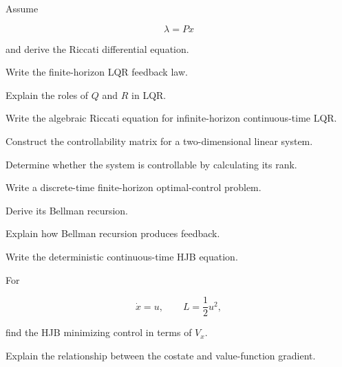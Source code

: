 \begin{exercise}[3]
Assume

\[
\lambda=Px
\]

and derive the Riccati differential equation.
\end{exercise}

\begin{exercise}[3]
Write the finite-horizon LQR feedback law.
\end{exercise}

\begin{exercise}[3]
Explain the roles of \(Q\) and \(R\) in LQR.
\end{exercise}

\begin{exercise}[3]
Write the algebraic Riccati equation for infinite-horizon continuous-time
LQR.
\end{exercise}

\begin{exercise}[3]
Construct the controllability matrix for a two-dimensional linear system.
\end{exercise}

\begin{exercise}[3]
Determine whether the system is controllable by calculating its rank.
\end{exercise}

\begin{exercise}[3]
Write a discrete-time finite-horizon optimal-control problem.
\end{exercise}

\begin{exercise}[3]
Derive its Bellman recursion.
\end{exercise}

\begin{exercise}[3]
Explain how Bellman recursion produces feedback.
\end{exercise}

\begin{exercise}[3]
Write the deterministic continuous-time HJB equation.
\end{exercise}

\begin{exercise}[3]
For

\[
\dot{x}=u,
\qquad
L=\frac12u^2,
\]

find the HJB minimizing control in terms of \(V_x\).
\end{exercise}

\begin{exercise}[3]
Explain the relationship between the costate and value-function gradient.
\end{exercise}


